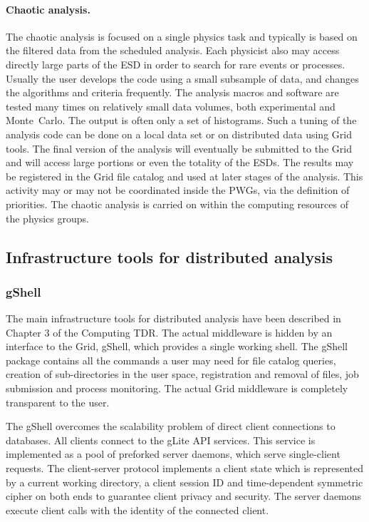 \documentclass[12pt,a4paper,twoside]{article}
\makeatletter
\newcommand {\grid} {Grid\@\xspace}
\newcommand {\MC} {Monte~Carlo\@\xspace}
\makeatother
\begin{document}
{\noindent
\paragraph{Chaotic analysis.}
\noindent
The chaotic analysis is focused on a single physics task and
typically is based on the filtered data from the scheduled
analysis. Each physicist also
may access directly large parts of the ESD in order to search for rare
events or processes.
Usually the user develops the code using a small subsample
of data, and changes the algorithms and criteria frequently. The
analysis macros and software are tested many times on relatively
small data volumes, both experimental and \MC.
The output is often only a set of histograms. 
Such a tuning of the analysis code can be done on a local
data set or on distributed data using \grid tools. The final version
of the analysis 
will eventually be submitted to the \grid and will access large
portions or even 
the totality of the ESDs. The results may be registered in the \grid file
catalog and used at later stages of the analysis. 
This activity may or may not be coordinated inside
the PWGs, via the definition of priorities. The
chaotic analysis is carried on within the computing resources of the
physics groups.



\subsection{Infrastructure tools for distributed analysis}

\subsubsection{gShell}

The main infrastructure tools for distributed analysis have been
described in Chapter 3 of the Computing TDR\cite{CompTDR}. The actual
middleware is hidden by an interface to the \grid,
gShell\cite{CH6Ref:gShell}, which provides a 
single working shell.  
The gShell package contains all the commands a user may need for file
catalog queries, creation of sub-directories in the user space,
registration and removal of files, job submission and process
monitoring. The actual \grid middleware  is completely transparent to
the user.

The gShell overcomes the scalability problem of direct client
connections to databases. All clients connect to the
gLite\cite{CH6Ref:gLite} API 
services. This service is implemented as a pool of preforked server
daemons, which serve single-client requests. The client-server
protocol implements a client state which is represented by a current
working directory, a client session ID and time-dependent symmetric
cipher on both ends to guarantee client privacy and security. The
server daemons execute client calls with the identity of the connected
client. 

}
\end{document}
